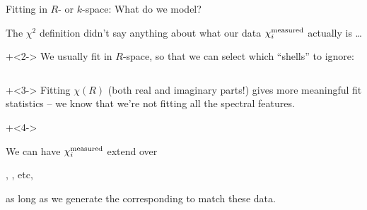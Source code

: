 \begin{slide}{Fitting in $R$- or $k$-space:  What do we model?}

  \begin{cenpage}{135mm}
  The $\chi^2$ definition didn't say anything about what our data
  $\chi_i^{\rm measured}$ actually is \ldots

  \onslide+<2->
  \vmm  We usually fit in $R$-space, so that  we can select which
  ``shells'' to ignore:

  \vmm \vmm

  \begin{columns}
    \begin{column}{53mm}    \end{column}
    \begin{column}{53mm}    \end{column}
  \end{columns}

  \vmm \onslide+<3-> Fitting $\chi(R)$ (both real and imaginary parts!) gives more
  meaningful fit statistics -- we know that we're not fitting all the
  spectral features.

  \vmm \onslide+<4->

  {}    We can have $\chi_i^{\rm measured}$  extend over

  \begin{center}{}, {},  etc, \end{center}

  as long as we generate the corresponding {} to
  match these data.

  \vfill
  \end{cenpage}
\end{slide}
